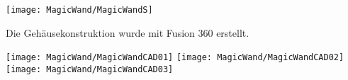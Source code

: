 \texttt{[image: MagicWand/MagicWandS]}

\bigskip

Die Gehäusekonstruktion wurde mit Fusion 360 erstellt.

\bigskip

\texttt{[image: MagicWand/MagicWandCAD01]}
\texttt{[image: MagicWand/MagicWandCAD02]}
\texttt{[image: MagicWand/MagicWandCAD03]}

\bigskip

{
}


{
}